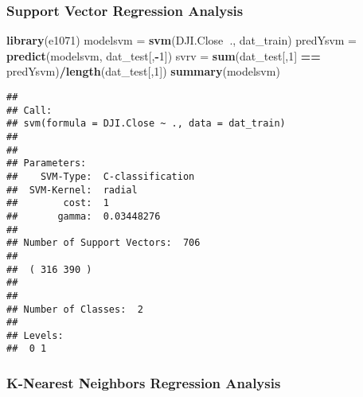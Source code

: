 \documentclass[]{article}
\newenvironment{Shaded}{\begin{snugshade}}{\end{snugshade}}
\newcommand{\KeywordTok}[1]{\textcolor[rgb]{0.13,0.29,0.53}{\textbf{#1}}}
\newcommand{\DecValTok}[1]{\textcolor[rgb]{0.00,0.00,0.81}{#1}}
\newcommand{\StringTok}[1]{\textcolor[rgb]{0.31,0.60,0.02}{#1}}
\newcommand{\OperatorTok}[1]{\textcolor[rgb]{0.81,0.36,0.00}{\textbf{#1}}}
\newcommand{\NormalTok}[1]{#1}
\begin{document}
 

\newpage

\pagebreak

\subsubsection{Support Vector Regression
Analysis}\label{support-vector-regression-analysis}

\begin{Shaded}
\begin{Highlighting}[]
\KeywordTok{library}\NormalTok{(e1071)}
\NormalTok{modelsvm =}\StringTok{ }\KeywordTok{svm}\NormalTok{(DJI.Close}\OperatorTok{~}\NormalTok{., dat_train)}
\NormalTok{predYsvm =}\StringTok{ }\KeywordTok{predict}\NormalTok{(modelsvm, dat_test[,}\OperatorTok{-}\DecValTok{1}\NormalTok{])}
\NormalTok{svrv =}\StringTok{ }\KeywordTok{sum}\NormalTok{(dat_test[,}\DecValTok{1}\NormalTok{] }\OperatorTok{==}\StringTok{ }\NormalTok{predYsvm)}\OperatorTok{/}\KeywordTok{length}\NormalTok{(dat_test[,}\DecValTok{1}\NormalTok{])}
\KeywordTok{summary}\NormalTok{(modelsvm)}
\end{Highlighting}
\end{Shaded}

\begin{verbatim}
## 
## Call:
## svm(formula = DJI.Close ~ ., data = dat_train)
## 
## 
## Parameters:
##    SVM-Type:  C-classification 
##  SVM-Kernel:  radial 
##        cost:  1 
##       gamma:  0.03448276 
## 
## Number of Support Vectors:  706
## 
##  ( 316 390 )
## 
## 
## Number of Classes:  2 
## 
## Levels: 
##  0 1
\end{verbatim}

\pagebreak

\subsubsection{K-Nearest Neighbors Regression
Analysis}\label{k-nearest-neighbors-regression-analysis}
\end{document}
